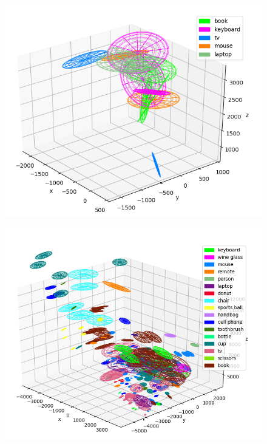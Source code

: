 \documentclass{article}
\begin{document}
\begin{itemize}
\begin{figure}[H]
\centering
\begin{minipage}{.5\textwidth}
  \centering
  \includegraphics[width=\textwidth]{Images/batch_14_2bookNaN.png}
  \label{fig:batch_14_2bookNaN}
\end{minipage}%
\begin{minipage}{.5\textwidth}
  \centering
  \includegraphics[width=\textwidth]{Images/incremental_236.png}
  \label{fig:incremental_236}
\end{minipage}
\end{figure}


\end{itemize}
\end{document}
